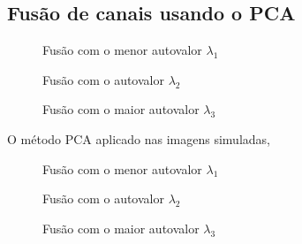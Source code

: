 \subsection{Fusão de canais usando o PCA}

\begin{figure}[!hbt]
\caption{Fusão com o menor autovalor $\lambda_1$}\label{cap_fusao_fig11}
\endminipage\hfill
{}
\caption{Fusão com o autovalor $\lambda_2$}\label{cap_fusao_fig12}
\endminipage\hfill
\centering
{}
\caption{Fusão com o maior autovalor $\lambda_3$}\label{cap_fusao_fig13}
\endminipage\hfill
\end{figure}

O método PCA aplicado nas imagens simuladas, 

\begin{figure}[!hbt]
\caption{Fusão com o menor autovalor $\lambda_1$}\label{cap_fusao_fig14}
\endminipage\hfill
{}
\caption{Fusão com o autovalor $\lambda_2$}\label{cap_fusao_fig15}
\endminipage\hfill
\centering
{}
\caption{Fusão com o maior autovalor $\lambda_3$}\label{cap_fusao_fig16}
\endminipage\hfill
\end{figure}
